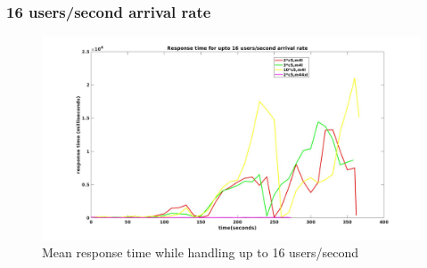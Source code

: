 \begin{frame}
\frametitle{16 users/second arrival rate}
\begin{figure}[h]
	\centering
	\includegraphics[width=1\textwidth]{images/scale16.jpg}
	\caption{Mean response time while handling up to 16 users/second}\label{fig:sqlopt}
\end{figure}
\end{frame}
